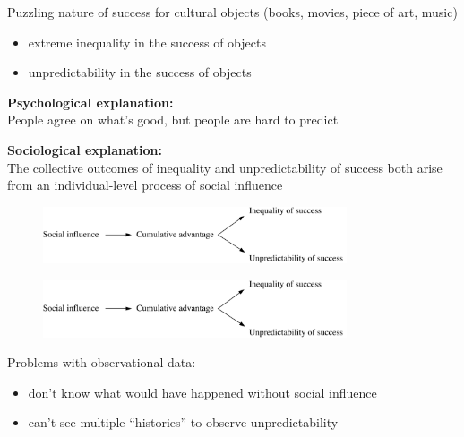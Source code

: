 \documentclass[aspectratio=169]{beamer}
\begin{document}
\begin{frame}

  Puzzling nature of success for cultural objects (books, movies, piece of art, music)
  \vspace{0.2in}
  \begin{itemize}
    \item<1-> extreme inequality in the success of objects \\
    \item <2-> unpredictability in the success of objects \\
  \end{itemize}

\end{frame}
\begin{frame} 

\textbf{Psychological explanation:}\\
People agree on what's good, but people are hard to predict\\

\vspace{0.2in}

\textbf{Sociological explanation:}\\
The collective outcomes of inequality and unpredictability of success both arise from an individual-level process of social influence\\

\begin{figure}
  \includegraphics[width = 0.8\textwidth]{figures/musiclab_model}
\end{figure}

\end{frame}

\begin{frame}

\begin{figure}
  \includegraphics[width = 0.8\textwidth]{figures/musiclab_model}
\end{figure}

Problems with observational data:
\begin{itemize}
\item don't know what would have happened without social influence
\pause
\item can't see multiple ``histories'' to observe unpredictability
\end{itemize}

\end{frame}
\end{document}
